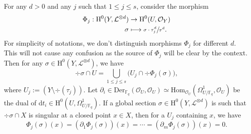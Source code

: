 \documentclass[11pt]{article}
\numberwithin{equation}{section}
\newcommand\mto{\mathchoice{\longmapsto}{\mapsto}{\mapsto}{\mapsto}}
\theoremstyle{plain}
\theoremstyle{definition}
\newcommand{\ho}{\mathrm{H}}
\newcommand{\Hom}{\mathrm{Hom}}
\newcommand{\Oc}{\mathcal{O}}
\newcommand{\li}{\mathcal{L}}
\newcommand{\F}{\mathbb{F}}
\begin{document}
For any $d>0$ and any $j$ such that $1\leq j\leq s$, consider the morphism
\begin{align*}
\Phi_j: \ho^0(Y,\mathcal{L}^{\otimes d}) & \to \ho^0(U, \Oc_Y) \\
\sigma & \mto \sfrac{\sigma \cdot \tau_j^d}{\tau^d}.
\end{align*}
For simplicity of notations, we don't distinguish morphisms $\Phi_j$ for different $d$. This will not cause any confusion as the source of $\Phi_j$ will be clear by the context. Then for any $\sigma\in \ho^0(Y, \li^{\otimes d})$, we have\vspace*{-3pt}
\[
\div \sigma \cap U=\bigcup_{1\leq j\leq s}\bigl(U_j\cap \div \Phi_j(\sigma)\bigr),
\]
where $U_j:=\left(Y\setminus\div (\tau_j)\right)$. Let $\partial_i\in \mathrm{Der}_{\F_q}(\mathcal{O}_U, \mathcal{O}_U)\simeq \Hom_{\mathcal{O}_U}(\Omega^1_{U/\F_q}, \mathcal{O}_U)$ be the dual of $\mathrm{d}t_i\in \ho^0(U, \Omega^1_{U/\F_q})$. If a global section $\sigma\in \ho^0(Y, \li^{\otimes d})$ is such that $\div \sigma\cap X$ is singular at a closed point $x\in X$, then for a $U_j$ containing $x$, we have\vspace*{-3pt}
\[
\Phi_j(\sigma)(x)=\left(\partial_1 \Phi_j(\sigma)\right)(x)=\cdots =\left(\partial_m \Phi_j(\sigma) \right)(x)=0.
\]
\end{document}
